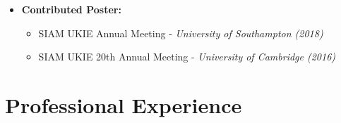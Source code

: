 \documentclass[10pt,a4paper,sans]{moderncv}        %
\begin{document}
\begin{itemize}
		\item{\textbf{Contributed Poster:}
			\small{
				\begin{itemize}
					\vspace{3pt}
					\item SIAM UKIE Annual Meeting - \textit{University of Southampton (2018)}
					\vspace{3pt}
					\item SIAM UKIE 20th Annual Meeting - \textit{University of Cambridge (2016)}
		\end{itemize}}}
		
	\end{itemize}
	
	\section{Professional Experience}
	
	\vspace{6pt}
	
\end{document}
